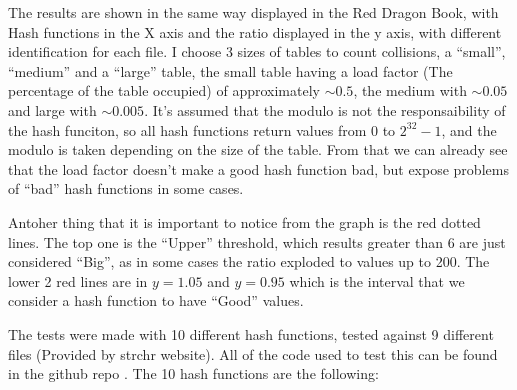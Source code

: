 The results are shown in the same way displayed in the Red Dragon Book, with Hash functions in the X axis and the ratio displayed in the y axis, with different identification for each file. I choose 3 sizes of tables to count collisions, a ``small'', ``medium'' and a ``large'' table, the small table having a load factor (The percentage of the table occupied) of approximately \( \sim 0.5 \), the medium with \( \sim 0.05 \) and large with \( \sim 0.005 \). It's assumed that the modulo is not the responsaibility of the hash funciton, so all hash functions return values from 0 to \( 2^{32} - 1 \), and the modulo is taken depending on the size of the table. From that we can already see that the load factor doesn't make a good hash function bad, but expose problems of ``bad'' hash functions in some cases. 

Antoher thing that it is important to notice from the graph is the red dotted lines. The top one is the ``Upper'' threshold, which results greater than 6 are just considered ``Big'', as in some cases the ratio exploded to values up to 200. The lower 2 red lines are in \( y = 1.05 \) and \( y = 0.95 \) which is the interval that we consider a hash function to have ``Good'' values. 

The tests were made with 10 different hash functions, tested against 9 different files (Provided by strchr website). All of the code used to test this can be found in the github repo \cite{GithubRepo}. The 10 hash functions are the following:

